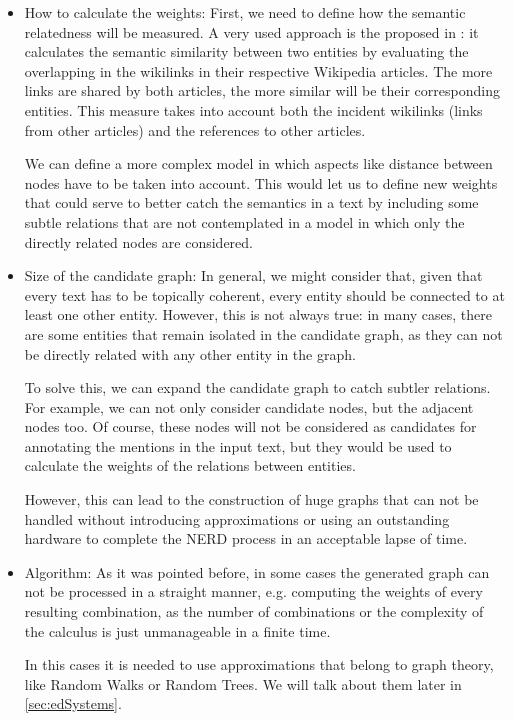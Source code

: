\begin{itemize}
	\item How to calculate the weights: First, we need to define how the semantic relatedness will be measured. A very used approach is the proposed in \cite{witten2008}: it calculates the semantic similarity between two entities by evaluating the overlapping in the wikilinks in their respective Wikipedia articles. The more links are shared by both articles, the more similar will be their corresponding entities. This measure takes into account both the incident wikilinks (links from other articles) and the references to other articles.
	
	We can define a more complex model in which aspects like distance between nodes have to be taken into account. This would let us to define new weights that could serve to better catch the semantics in a text by including some subtle relations that are not contemplated in a model in which only the directly related nodes are considered.
	
	\item Size of the candidate graph: In general, we might consider that, given that every text has to be topically coherent, every entity should be connected to at least one other entity. However, this is not always true: in many cases, there are some entities that remain isolated in the candidate graph, as they can not be directly related with any other entity in the graph.
	
	To solve this, we can expand the candidate graph to catch subtler relations. For example, we can not only consider candidate nodes, but the adjacent nodes too. Of course, these nodes will not be considered as candidates for annotating the mentions in the input text, but they would be used to calculate the weights of the relations between entities.
	
	However, this can lead to the construction of huge graphs that can not be handled without introducing approximations or using an outstanding hardware to complete the NERD process in an acceptable lapse of time. 
	
	\item Algorithm: As it was pointed before, in some cases the generated graph can not be processed in a straight manner, e.g. computing the weights of every resulting combination, as the number of combinations or the complexity of the calculus is just unmanageable in a finite time.
	
	In this cases it is needed to use approximations that belong to graph theory, like Random Walks or Random Trees. We will talk about them later in \autoref{sec:edSystems}.
\end{itemize}

